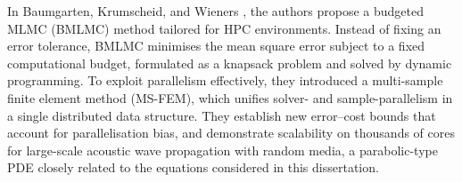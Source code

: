 In Baumgarten, Krumscheid, and Wieners \cite{baumgarten2024fully}, the 
authors propose a budgeted MLMC (BMLMC) method tailored for HPC environments. 
Instead of fixing an error tolerance, BMLMC minimises the mean square error 
subject to a fixed computational budget, formulated as a knapsack problem 
and solved by dynamic programming. To exploit parallelism effectively, they 
introduced a multi-sample finite element method (MS-FEM), which unifies 
solver- and sample-parallelism in a single distributed data structure. 
They establish new error--cost bounds that account for parallelisation bias, 
and demonstrate scalability on thousands of cores for large-scale acoustic 
wave propagation with random media, a parabolic-type PDE closely related 
to the equations considered in this dissertation.


